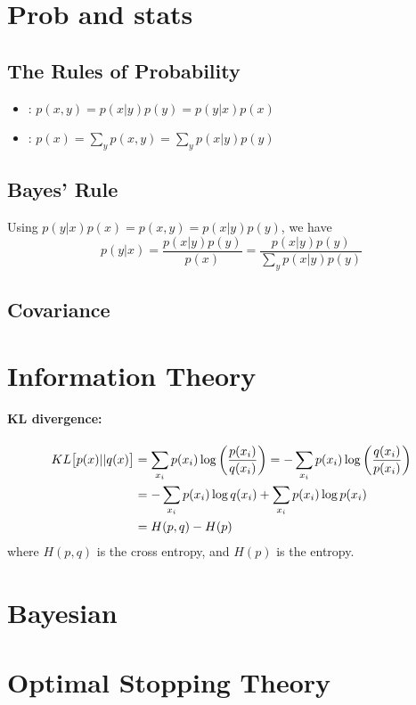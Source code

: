 \documentclass[11pt]{article}
\begin{document}
\section{Prob and stats}
\subsection{The Rules of Probability}
\begin{itemize}
  \item {}: $p(x, y) = p(x|y) p(y) = p(y|x) p(x)$
  \item {}: $p(x) = \sum\limits_y p(x, y) = \sum\limits_y p(x | y) p(y)$
\end{itemize}

\subsection{Bayes' Rule}
Using $p(y|x) p(x) = p(x, y) = p(x|y) p(y)$, we have
\begin{equation}
  p(y|x) = \frac{p(x|y) p(y)}{p(x)} = \frac{p(x|y) p(y)}{\sum\limits_y p(x|y) p(y)}
\end{equation}

\subsection{Covariance}


\section{Information Theory}
\paragraph{KL divergence:}
\begin{align}
  KL\big[p(x) || q(x)\big] &= \sum_{x_i} p(x_i) \log\left(\frac{p(x_i)}{q(x_i)} \right)
                              = -\sum_{x_i} p(x_i) \log\left(\frac{q(x_i)}{p(x_i)}
                              \right) \nonumber\\ 
  &= -\sum_{x_i} p(x_i) \log q(x_i) + \sum_{x_i} p(x_i) \log p(x_i) \nonumber\\
  &= H(p,q) - H(p)
\end{align}
where $H(p,q)$ is the cross entropy, and $H(p)$ is the entropy.


\section{Bayesian}



\section{Optimal Stopping Theory}





\end{document}

